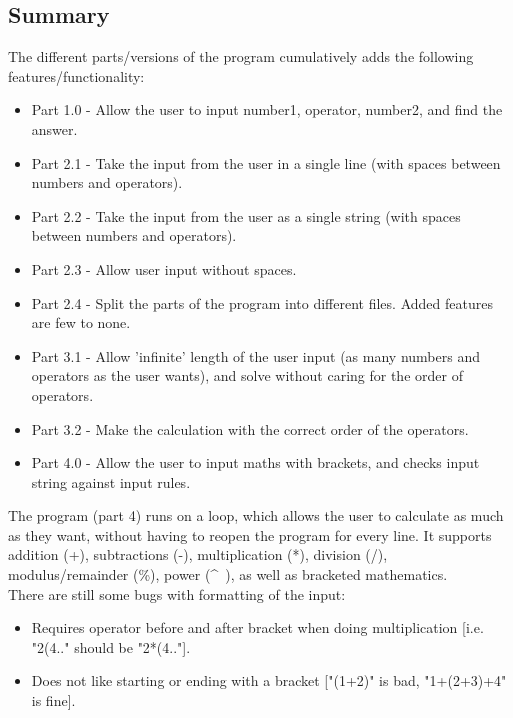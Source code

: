 \documentclass{article}
\begin{document}
		
		\subsection{Summary}
			The different parts/versions of the program cumulatively adds the following features/functionality:
			\begin{itemize}
				\item Part 1.0	- Allow the user to input number1, operator, number2, and find the answer.
				\item Part 2.1	- Take the input from the user in a single line (with spaces between numbers and operators).
				\item Part 2.2	- Take the input from the user as a single string (with spaces between numbers and operators).
				\item Part 2.3	- Allow user input without spaces.
				\item Part 2.4	- Split the parts of the program into different files. Added features are few to none.
				\item Part 3.1	- Allow 'infinite' length of the user input (as many numbers and operators as the user wants), and solve without caring for the order of operators.
				\item Part 3.2	- Make the calculation with the correct order of the operators.
				\item Part 4.0	- Allow the user to input maths with brackets, and checks input string against input rules.
			\end{itemize}
	
			The program (part 4) runs on a loop, which allows the user to calculate as much as they want, without having to reopen the program for every line.
			It supports addition (+), subtractions (-), multiplication (*), division (/), modulus/remainder (\%), power (\^~), as well as bracketed mathematics. \\
			There are still some bugs with formatting of the input:
			\begin{itemize}
				\item Requires operator before and after bracket when doing multiplication [i.e. "2(4.." should be "2*(4.."].
				\item Does not like starting or ending with a bracket ["(1+2)" is bad, "1+(2+3)+4" is fine].
			\end{itemize}
			
\end{document}
